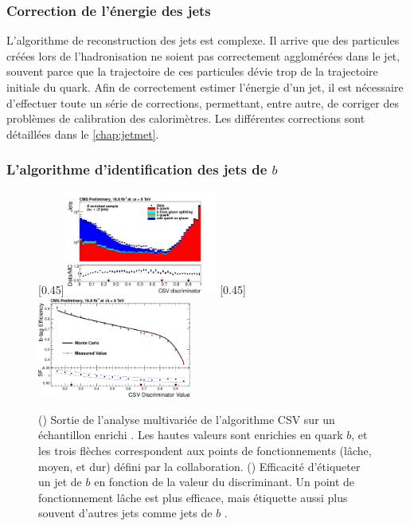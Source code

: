 \subsubsection{Correction de l'énergie des jets}

L'algorithme de reconstruction des jets est complexe. Il arrive que des particules créées lors de l'hadronisation ne soient pas correctement agglomérées dans le jet, souvent parce que la trajectoire de ces particules dévie trop de la trajectoire initiale du quark. Afin de correctement estimer l'énergie d'un jet, il est nécessaire d'effectuer toute un série de corrections, permettant, entre autre, de corriger des problèmes de calibration des calorimètres. Les différentes corrections sont détaillées dans le \cref{chap:jetmet}.

\subsubsection{L'algorithme d'identification des jets de $b$}

\begin{figure}[tbp]
    \centering
    \subcaptionbox{\label{fig:btag_discri}}[0.45\textwidth]{\includegraphics[width=0.45\textwidth]{chapitre3/figs/btag_tt_csv.pdf}} \hfill
    \subcaptionbox{\label{fig:btag_csv_eff}}[0.45\textwidth]{\includegraphics[width=0.45\textwidth]{chapitre3/figs/btag_csv_eff.pdf}}
    \caption{() Sortie de l'analyse multivariée de l'algorithme CSV sur un échantillon enrichi \ttbar. Les hautes valeurs sont enrichies en quark $b$, et les trois flèches correspondent aux points de fonctionnements (lâche, moyen, et dur) défini par la collaboration. () Efficacité d'étiqueter un jet de $b$ en fonction de la valeur du discriminant. Un point de fonctionnement lâche est plus efficace, mais étiquette aussi plus souvent d'autres jets comme jets de $b$ \citep{btag_perf}.}
    \label{fig:btag_perf}
\end{figure}


